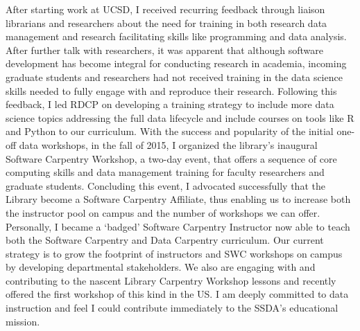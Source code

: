 \documentclass[11pt,letterpaper,sans]{moderncv}
\begin{document}
After starting work at UCSD, I received recurring feedback through liaison librarians and researchers about the need for training in both research data management and research facilitating skills like programming and data analysis. After further talk with researchers, it was apparent that although software development has become integral for conducting research in academia, incoming graduate students and researchers had not received training in the data science skills needed to fully engage with and reproduce their research. Following this feedback, I led RDCP on developing a training strategy to include more data science topics addressing the full data lifecycle and include courses on tools like R and Python to our curriculum.  With the success and popularity of the initial one-off  data workshops, in the fall of 2015, I organized the library’s inaugural Software Carpentry Workshop, a two-day event, that offers a sequence of core computing skills and data management training for faculty researchers and graduate students. Concluding this event, I advocated successfully that the Library become a Software Carpentry Affiliate, thus enabling us to increase both the instructor pool on campus and the number of workshops we can offer. Personally, I became a ‘badged’ Software Carpentry Instructor now able to teach both the Software Carpentry and Data Carpentry curriculum.  Our current strategy is to grow the footprint of instructors and SWC workshops on campus by developing departmental stakeholders. We also are engaging with and contributing to the nascent Library Carpentry Workshop lessons and recently offered the first workshop of this kind in the US. I am deeply committed to data instruction and feel I could contribute immediately to the SSDA’s educational mission. 
\end{document}
